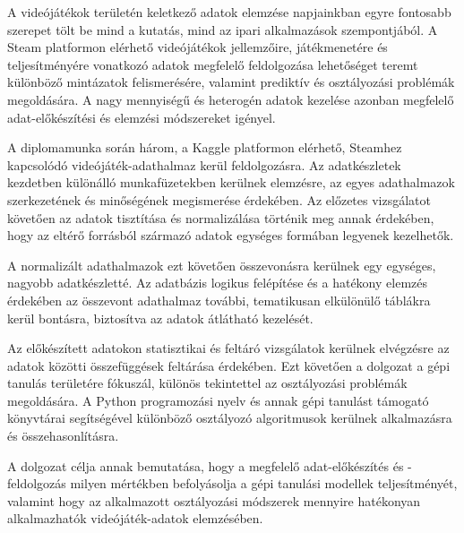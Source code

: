 
A videójátékok területén keletkező adatok elemzése napjainkban egyre fontosabb szerepet tölt be mind a kutatás, mind az ipari alkalmazások szempontjából. A Steam \cite{steam} platformon elérhető videójátékok jellemzőire, játékmenetére és teljesítményére vonatkozó adatok megfelelő feldolgozása lehetőséget teremt különböző mintázatok felismerésére, valamint prediktív és osztályozási problémák megoldására. A nagy mennyiségű és heterogén adatok kezelése azonban megfelelő adat-előkészítési és elemzési módszereket igényel.

A diplomamunka során három, a Kaggle \cite{kaggle} platformon elérhető, Steamhez kapcsolódó videójáték-adathalmaz kerül feldolgozásra. Az adatkészletek kezdetben különálló munkafüzetekben kerülnek elemzésre, az egyes adathalmazok szerkezetének és minőségének megismerése érdekében. Az előzetes vizsgálatot követően az adatok tisztítása és normalizálása történik meg annak érdekében, hogy az eltérő forrásból származó adatok egységes formában legyenek kezelhetők.

A normalizált adathalmazok ezt követően összevonásra kerülnek egy egységes, nagyobb adatkészletté. Az adatbázis logikus felépítése és a hatékony elemzés érdekében az összevont adathalmaz további, tematikusan elkülönülő táblákra kerül bontásra, biztosítva az adatok átlátható kezelését.

Az előkészített adatokon statisztikai és feltáró vizsgálatok kerülnek elvégzésre az adatok közötti összefüggések feltárása érdekében. Ezt követően a dolgozat a gépi tanulás területére fókuszál, különös tekintettel az osztályozási problémák megoldására. A Python \cite{python} programozási nyelv és annak gépi tanulást támogató könyvtárai segítségével különböző osztályozó algoritmusok kerülnek alkalmazásra és összehasonlításra.

A dolgozat célja annak bemutatása, hogy a megfelelő adat-előkészítés és -feldolgozás milyen mértékben befolyásolja a gépi tanulási modellek teljesítményét, valamint hogy az alkalmazott osztályozási módszerek mennyire hatékonyan alkalmazhatók videójáték-adatok elemzésében.
